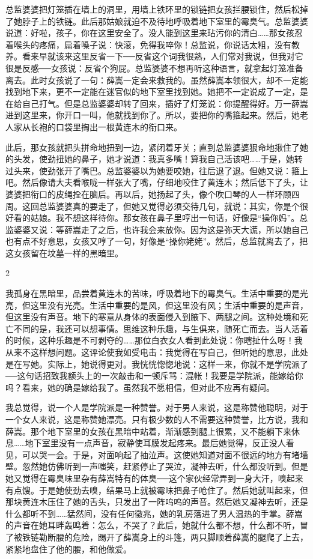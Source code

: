 总监婆婆把灯笼插在墙上的洞里，用墙上铁环里的锁链把女孩拦腰锁住，然后松掉了她脖子上的铁链。此后那姑娘就迫不及待地呼吸着地下室里的霉臭气。总监婆婆说道：好啦，孩子，你在这里安全了。没人能到这里来玷污你的清白……那女孩忍着喉头的疼痛，扁着嗓子说：快滚，免得我啐你！总监说，你说话太粗，没有教养。看来早就该来这里反省一下──反省这个词我很熟，人们常对我说，但我对它很是反感──女孩说：反省个狗屁。总监婆婆不想再听这种语言，就拿起灯笼准备离去。此时女孩说了一句：薛嵩一定会来救我的。虽然薛嵩本领很大，却不一定能找到地下来，更不一定能在迷官似的地下室里找到她。她把不一定说成了一定，是在给自己打气。但是总监婆婆却转了回来，插好了灯笼说：你提醒得好。万一薛嵩进到这里来，你开口一叫，他就找到你了。所以，要把你的嘴箍起来。然后，她老人家从长袍的口袋里掏出一根黄连木的衔口来。 

此后，那女孩就把头拼命地扭到一边，紧闭着牙关；直到总监婆婆狠命地揪住了她的头发，使劲扭她的鼻子，她才说道：我真多嘴！算我自己活该吧……于是，她转过头来，使劲张开了嘴巴。总监婆婆以为她要咬她，往后退了退。但她又说：箍上吧。然后像请大夫看喉咙一样张大了嘴，仔细地咬住了黄连木；然后低下了头，让婆婆把衔口的皮绳拴在脑后。再以后，她扬起了头，像个吹口琴的人一样环顾四周。这回总监婆婆真的要走了，但她又觉得必须交待几句，就说：其实，你是个很好看的姑娘。我不想这样待你。那女孩在鼻子里哼出一句话，好像是“操你妈”。总监婆婆又说：等薛嵩走了之后，也许我会来放你。因为这是弥天大谎，所以她自己也有点不好意思，女孩又哼了一句，好像是“操你姥姥”。然后，总监就离去了，把这女孩留在坟墓一样的黑暗里。 

2 

我孤身在黑暗里，品尝着黄连木的苦味，呼吸着地下的霉臭气。生活中重要的是光亮，但这里没有光亮。生活中重要的是风，但这里没有风；生活中重要的是声音，但这里没有声音。地下的寒意从身体的表面侵入到腋下、两腿之间。这种处境和死亡不同的是，我还可以想事情。思维这种乐趣，与生俱来，随死亡而去。当人活着的时候，这种乐趣是不可剥夺的……那位白衣女人看到此处说：你瞎扯什么呀！我从来不这样想问题。这评论使我如受电击：我觉得在写自己，但听她的意思，此处是在写她。实际上，她说得更对。我恍恍惚惚地说：这样一来，你就不是学院派了──这句话招致我额头上的一次敲击和一顿斥骂：混帐！我要是学院派，能嫁给你吗？看来，她的确是嫁给我了。虽然我不愿相信，但对此不应再有疑问。 

我总觉得，说一个人是学院派是一种赞誉。对于男人来说，这是称赞他聪明，对于一个女人来说，这是称赞她漂亮。只有极少数的人不需要这种赞誉，比方说，我和薛嵩。那个地下室里的女孩在黑暗中站着，渐渐感到腿上很累，又不能躺下来休息……地下室里没有一点声音，寂静使耳膜发起疼来。最后她觉得，反正没人看见，可以哭一会。于是，对面响起了抽泣声。这使她知道对面不很远的地方有堵墙壁。忽然她仿佛听到一声嗤笑，赶紧停止了哭泣，凝神去听，什么都没听到。但是她又觉得在霉臭味里杂有薛嵩特有的体臭──这个家伙经常弄到一身大汗，嗅起来有点馊。于是她使劲去嗅，结果马上就被霉味把鼻子呛住了。然后她就叫起来，但那块黄连木压住了她的舌头，只发出了一阵呜呜的声音。然后她又凝神去听，还是什么都听不到……猛然间，没有任何徵兆，她的乳房落进了男人温热的手掌。薛嵩的声音在她耳畔轰鸣着：怎么，不哭了？此后，她就什么都不想，什么都不听，冒了被铁链勒断腰的危险，踢开了薛嵩身上的斗篷，两只脚顺着薛嵩的腿爬了上去，紧紧地盘住了他的腰，和他做爱。 

